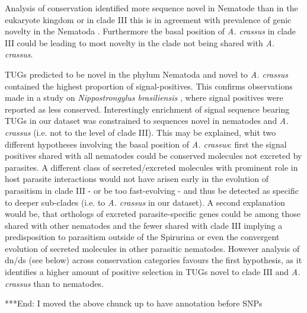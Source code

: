 \documentclass[10pt]{bmc_article}
\newenvironment{bmcformat}{\begin{raggedright}\baselineskip20pt\sloppy\setboolean{publ}{false}}{\end{raggedright}\baselineskip20pt\sloppy}
\begin{document}
\begin{bmcformat}
Analysis of conservation identified more sequence novel in Nematode
than in the eukaryote kingdom or in clade III this is in agreement
with prevalence of genic novelty in the Nematoda
\cite{wasmuth_extent_2008}. Furthermore the basal position of
\textit{A. crassus} in clade III could be leading to most novelty in
the clade not being shared with \textit{A. crassus}.

TUGs predicted to be novel in the phylum Nematoda and novel to
\textit{A. crassus} contained the highest proportion of
signal-positives. This confirms observations made in a study on
\textit{Nippostrongylus brasiliensis} \cite{harcus_signal_2004}, where
signal positives were reported as less conserved. Interestingly
enrichment of signal sequence bearing TUGs in our dataset was
constrained to sequences novel in nematodes and \textit{A. crassus}
(i.e. not to the level of clade III). This may be explained, whit two
different hypotheses involving the basal position of
\textit{A. crassus}: first the signal positives shared with all
nematodes could be conserved molecules not excreted by parasites. A
different class of secreted/excreted molecules with prominent role in
host parasite interactions would not have arisen early in the
evolution of parasitism in clade III - or be too fast-evolving - and
thus be detected as specific to deeper sub-clades (i.e. to
\textit{A. crassus} in our dataset). A second explanation would be,
that orthologs of excreted parasite-specific genes could be among
those shared with other nematodes and the fewer shared with clade III
implying a predisposition to parasitism outside of the Spirurina or
even the convergent evolution of secreted molecules in other parasitic
nematodes. However analysis of dn/ds (see below) across conservation
categories favours the first hypothesis, as it identifies a higher
amount of positive selection in TUGs novel to clade III and
\textit{A. crassus} than to nematodes.

***End: I moved the above chunck up to have annotation before SNPs


\end{bmcformat}
\end{document}
